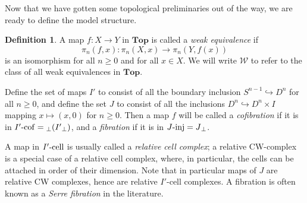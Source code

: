 \documentclass{amsart}
\theoremstyle{plain}
\theoremstyle{definition}
\newtheorem{definition}[theorem]{Definition}
\newcommand{\Top}{\mbf{Top}}
\newcommand{\sseq}{\subseteq}
\newcommand{\0}{\mathbf{0}}
\newcommand{\p}{{_\perp}}
\newcommand{\into}{\hookrightarrow}
\newcommand{\cW}{\mathcal W}
\newcommand{\mbf}[1]{\mathbf{#1}}
\renewcommand{\(}{\left(}
\renewcommand{\)}{\right)}
\newcommand{\inj}{\text-\mathrm{inj}}
\newcommand{\cell}{\text-\mathrm{cell}}
\newcommand{\cof}{\text-\mathrm{cof}}
\begin{document}
Now that we have gotten some topological preliminaries out of the way, we are ready to define the model structure.

\begin{definition}
  A map $f:X\to Y$ in $\Top$ is called a \textit{weak equivalence} if
  \[\pi_n(f,x):\pi_n(X,x)\to\pi_n(Y,f(x))\]
  is an isomorphism for all $n\geq0$ and for all $x\in X$. We will write $\cW$ to refer to the class of all weak equivalences in $\Top$.

  Define the set of maps $I'$ to consist of all the boundary inclusion $S^{n-1}\into D^n$ for all $n\geq0$, and define the set $J$ to consist of all the inclusions $D^n\into D^n\times I$ mapping $x\mapsto(x,0)$ for $n\geq0$. Then a map $f$ will be called a \textit{cofibration} if it is in $I'\cof={\p( I'\p )}$, and a \textit{fibration} if it is in $J\inj=J\p$.

  A map in $I'\cell$ is usually called a \textit{relative cell complex}; a relative CW-complex is a special case of a relative cell complex, where, in particular, the cells can be attached in order of their dimension. Note that in particular maps of $J$ are relative CW complexes, hence are relative $I'$-cell complexes. 
  A fibration is often known as a \textit{Serre fibration} in the literature.
\end{definition}
\end{document}
